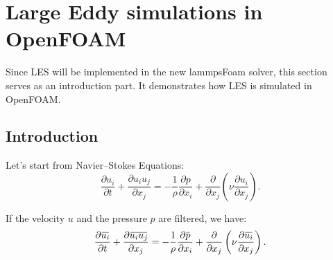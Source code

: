 \documentclass[11pt]{article}
\newcommand{\overbar}[1]{\mkern 1.5mu\overline{\mkern-1.5mu#1\mkern-1.5mu}\mkern 1.5mu}
\begin{document}
\section{Large Eddy simulations in OpenFOAM}

Since LES will be implemented in the new lammpsFoam solver, this section serves as an introduction
part. It demonstrates how LES is simulated in OpenFOAM.

\subsection{Introduction}

  Let's start from Navier--Stokes Equations:
  \begin{equation}
    \frac{\partial u_i}{\partial t}+\frac{\partial u_i u_j}{\partial x_j} = 
    - \frac{1}{\rho}\frac{\partial p}{\partial x_i}
    + \frac{\partial}{\partial x_j}\left( \nu\frac{\partial u_i}{\partial x_j}\right).
  \label{eqn:NS}
  \end{equation}

  If the velocity $u$ and the pressure $p$ are filtered, we have:
  \begin{equation}
    \frac{\partial \overbar{u_i}}{\partial t}+\frac{\partial \overbar{u_i u_j}}{\partial x_j} = 
    - \frac{1}{\rho}\frac{\partial \overbar{p}}{\partial x_i}
    + \frac{\partial}{\partial x_j}\left( \nu\frac{\partial \overbar{u_i}}{\partial x_j}\right).
  \label{eqn:NS-filtered}
  \end{equation}
\end{document}
